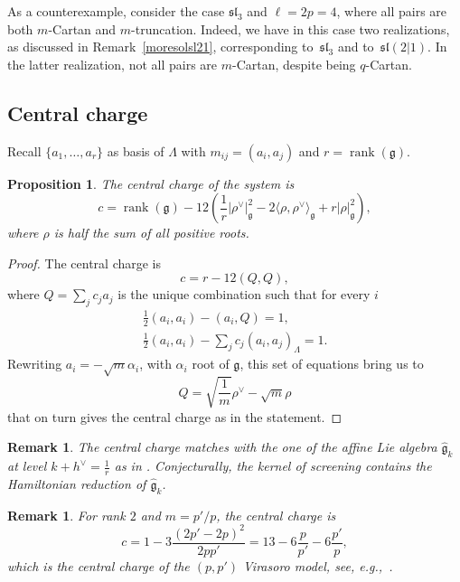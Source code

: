 \documentclass[pdftex]{sigma}%
\numberwithin{equation}{section}
\newtheorem{prop}[teo]{Proposition}
\newtheorem{oss}[teo]{Remark} }
\begin{document}
As a counterexample, consider the case $\mathfrak{sl}_3$ and $\ell=2p=4$, where all pairs are both $m$-Cartan and $m$-truncation. Indeed, we have in this case two realizations, as discussed in Remark~\ref{moresolsl21}, corresponding to~$\mathfrak{sl}_3$ and to~$\mathfrak{sl}(2|1)$. In the latter realization, not all pairs are $m$-Cartan, despite being $q$-Cartan.

\subsection{Central charge}
Recall $\{a_1, \dots, a_r\}$ as basis of $\Lambda$ with $m_{ij} = (a_i,a_j)$ and $r=\operatorname{rank}(\mathfrak{g})$.

\begin{prop} The central charge of the system is
\begin{equation*}
c= \operatorname{rank}(\mathfrak{g}) -12\left(\frac{1}{r}\big|\rho^\vee\big|_\mathfrak{g}^2-2\big\langle\rho, \rho^\vee\big\rangle_\mathfrak{g}+r |\rho |_\mathfrak{g}^2\right),
\end{equation*}
where $\rho$ is half the sum of all positive roots.
\end{prop}
\begin{proof}
The central charge is
\[
c = r - 12(Q, Q),
\] where $Q=\sum_j c_ja_j$ is the unique combination such that for every $i$
\begin{gather*}%
\frac{1}{2}(a_i,a_i) -(a_i,Q) =1,\\
\frac{1}{2}(a_i,a_i) -\sum_j c_j(a_i,a_j)_\Lambda =1.
\end{gather*}
Rewriting $a_i = -\sqrt{m}\alpha_i$, with $\alpha_i$ root of $\mathfrak{g}$, this set of equations bring us to
\begin{equation*}
Q= \sqrt{\frac{1}{m}}\rho^\vee-\sqrt{m}\rho
\end{equation*}
that on turn gives the central charge as in the statement.
\end{proof}

\begin{oss}
The central charge matches with the one of the affine Lie algebra $\hat{\mathfrak{g}}_k$ at level $k+h^\vee= \frac{1}{r}$ as in \cite{Arak07}. Conjecturally, the kernel of screening contains the Hamiltonian reduction of $\hat{\mathfrak{g}}_k$.
\end{oss}
\begin{oss} For rank $2$ and $m=p'/p$, the central charge is
\[ c= 1-3 \frac{(2p'-2p)^2}{2pp'} = 13 -6\frac{p}{p'}- 6\frac{p'}{p},
\] which is the central charge of the $(p,p')$ Virasoro model, see, e.g.,~\cite{TW13}.
\end{oss}
\end{document}
